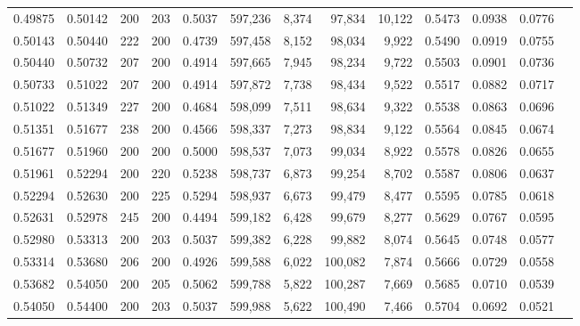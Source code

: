 \begin{tabular}{rrrrrrrrrrrrr}
0.49875 & 0.50142 &    200 & 203 &                                     0.5037 & 597,236 &   8,374 &  97,834 &  10,122 & 0.5473 & 0.0938 & 0.0776 \\
0.50143 & 0.50440 &    222 & 200 &                                     0.4739 & 597,458 &   8,152 &  98,034 &   9,922 & 0.5490 & 0.0919 & 0.0755 \\
0.50440 & 0.50732 &    207 & 200 &                                     0.4914 & 597,665 &   7,945 &  98,234 &   9,722 & 0.5503 & 0.0901 & 0.0736 \\
0.50733 & 0.51022 &    207 & 200 &                                     0.4914 & 597,872 &   7,738 &  98,434 &   9,522 & 0.5517 & 0.0882 & 0.0717 \\
0.51022 & 0.51349 &    227 & 200 &                                     0.4684 & 598,099 &   7,511 &  98,634 &   9,322 & 0.5538 & 0.0863 & 0.0696 \\
0.51351 & 0.51677 &    238 & 200 &                                     0.4566 & 598,337 &   7,273 &  98,834 &   9,122 & 0.5564 & 0.0845 & 0.0674 \\
0.51677 & 0.51960 &    200 & 200 &                                     0.5000 & 598,537 &   7,073 &  99,034 &   8,922 & 0.5578 & 0.0826 & 0.0655 \\
0.51961 & 0.52294 &    200 & 220 &                                     0.5238 & 598,737 &   6,873 &  99,254 &   8,702 & 0.5587 & 0.0806 & 0.0637 \\
0.52294 & 0.52630 &    200 & 225 &                                     0.5294 & 598,937 &   6,673 &  99,479 &   8,477 & 0.5595 & 0.0785 & 0.0618 \\
0.52631 & 0.52978 &    245 & 200 &                                     0.4494 & 599,182 &   6,428 &  99,679 &   8,277 & 0.5629 & 0.0767 & 0.0595 \\
0.52980 & 0.53313 &    200 & 203 &                                     0.5037 & 599,382 &   6,228 &  99,882 &   8,074 & 0.5645 & 0.0748 & 0.0577 \\
0.53314 & 0.53680 &    206 & 200 &                                     0.4926 & 599,588 &   6,022 & 100,082 &   7,874 & 0.5666 & 0.0729 & 0.0558 \\
0.53682 & 0.54050 &    200 & 205 &                                     0.5062 & 599,788 &   5,822 & 100,287 &   7,669 & 0.5685 & 0.0710 & 0.0539 \\
0.54050 & 0.54400 &    200 & 203 &                                     0.5037 & 599,988 &   5,622 & 100,490 &   7,466 & 0.5704 & 0.0692 & 0.0521 \\

\end{tabular}

